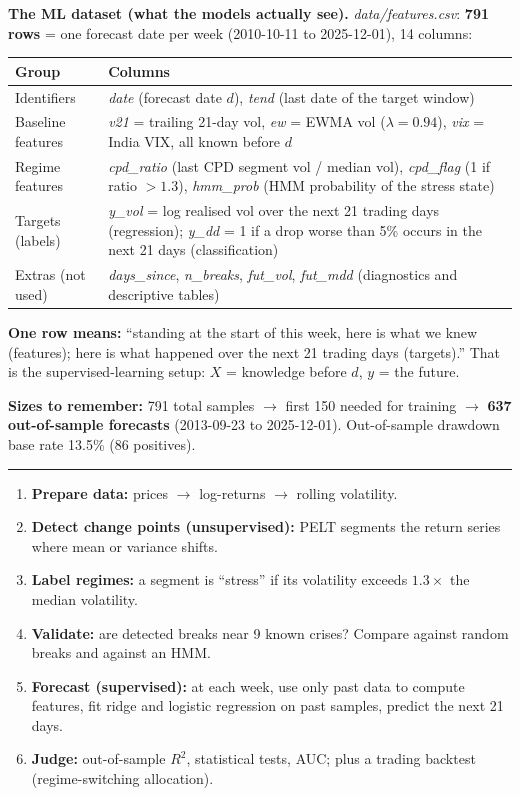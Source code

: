 \documentclass[10pt]{article}
\newcommand{\h}[1]{\vspace{4pt}{\large\bfseries #1}\par\vspace{1pt}\hrule\vspace{3pt}}
\begin{document}
\textbf{The ML dataset (what the models actually see).} \textit{data/features.csv}: \textbf{791 rows} = one forecast date per week (2010-10-11 to 2025-12-01), 14 columns:

\begin{tabular}{@{}lp{5.2in}@{}}\toprule
Group & Columns\\\midrule
Identifiers & \textit{date} (forecast date $d$), \textit{tend} (last date of the target window)\\
Baseline features & \textit{v21} = trailing 21-day vol, \textit{ew} = EWMA vol ($\lambda{=}0.94$), \textit{vix} = India VIX, all known before $d$\\
Regime features & \textit{cpd\_ratio} (last CPD segment vol / median vol), \textit{cpd\_flag} (1 if ratio $>1.3$), \textit{hmm\_prob} (HMM probability of the stress state)\\
Targets (labels) & \textit{y\_vol} = log realised vol over the next 21 trading days (regression); \textit{y\_dd} = 1 if a drop worse than 5\% occurs in the next 21 days (classification)\\
Extras (not used) & \textit{days\_since}, \textit{n\_breaks}, \textit{fut\_vol}, \textit{fut\_mdd} (diagnostics and descriptive tables)\\\bottomrule
\end{tabular}

\textbf{One row means:} ``standing at the start of this week, here is what we knew (features); here is what happened over the next 21 trading days (targets).'' That is the supervised-learning setup: $X$ = knowledge before $d$, $y$ = the future.

\textbf{Sizes to remember:} 791 total samples $\to$ first 150 needed for training $\to$ \textbf{637 out-of-sample forecasts} (2013-09-23 to 2025-12-01). Out-of-sample drawdown base rate 13.5\% (86 positives).

\h{3. The pipeline in six steps}
\begin{enumerate}
\item \textbf{Prepare data:} prices $\to$ log-returns $\to$ rolling volatility.
\item \textbf{Detect change points (unsupervised):} PELT segments the return series where mean or variance shifts.
\item \textbf{Label regimes:} a segment is ``stress'' if its volatility exceeds $1.3\times$ the median volatility.
\item \textbf{Validate:} are detected breaks near 9 known crises? Compare against random breaks and against an HMM.
\item \textbf{Forecast (supervised):} at each week, use only past data to compute features, fit ridge and logistic regression on past samples, predict the next 21 days.
\item \textbf{Judge:} out-of-sample $R^2$, statistical tests, AUC; plus a trading backtest (regime-switching allocation).
\end{enumerate}
\end{document}
